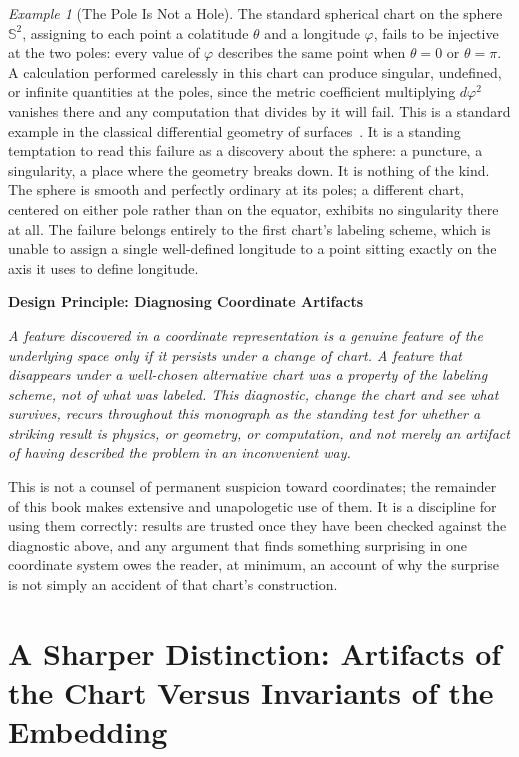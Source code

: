 \documentclass[11pt,fleqn]{book}
\numberwithin{equation}{chapter}
\newenvironment{principle}[1]
  {\begin{principleEnv}
   \noindent\textbf{Design Principle: #1}\par\smallskip\itshape}
  {\end{principleEnv}}
\theoremstyle{plain}
\theoremstyle{definition}
\theoremstyle{remark}
\newtheorem{example}[theorem]{Example}
\newcommand{\Sphere}{\mathbb{S}^{2}}
\begin{document}
\begin{example}[The Pole Is Not a Hole]
The standard spherical chart on the sphere \(\Sphere\), assigning to each point a colatitude \(\theta\) and a longitude \(\varphi\), fails to be injective at the two poles: every value of \(\varphi\) describes the same point when \(\theta=0\) or \(\theta=\pi\). A calculation performed carelessly in this chart can produce singular, undefined, or infinite quantities at the poles, since the metric coefficient multiplying \(d\varphi^2\) vanishes there and any computation that divides by it will fail. This is a standard example in the classical differential geometry of surfaces~\cite{docarmo1976}. It is a standing temptation to read this failure as a discovery about the sphere: a puncture, a singularity, a place where the geometry breaks down. It is nothing of the kind. The sphere is smooth and perfectly ordinary at its poles; a different chart, centered on either pole rather than on the equator, exhibits no singularity there at all. The failure belongs entirely to the first chart's labeling scheme, which is unable to assign a single well-defined longitude to a point sitting exactly on the axis it uses to define longitude.
\end{example}

\begin{principle}{Diagnosing Coordinate Artifacts}
A feature discovered in a coordinate representation is a genuine feature of the underlying space only if it persists under a change of chart. A feature that disappears under a well-chosen alternative chart was a property of the labeling scheme, not of what was labeled. This diagnostic, change the chart and see what survives, recurs throughout this monograph as the standing test for whether a striking result is physics, or geometry, or computation, and not merely an artifact of having described the problem in an inconvenient way.
\end{principle}

This is not a counsel of permanent suspicion toward coordinates; the remainder of this book makes extensive and unapologetic use of them. It is a discipline for using them correctly: results are trusted once they have been checked against the diagnostic above, and any argument that finds something surprising in one coordinate system owes the reader, at minimum, an account of why the surprise is not simply an accident of that chart's construction.

\section{A Sharper Distinction: Artifacts of the Chart Versus Invariants of the Embedding}
\end{document}
